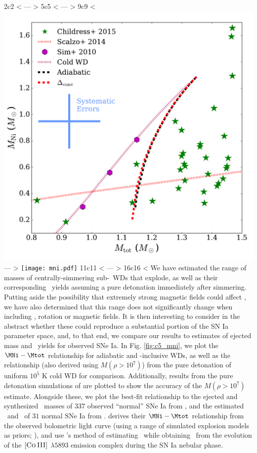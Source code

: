 2c2
< \label{sec:c5_discussion}
---
> \label{sec:discussion}
5c5
< \label{ssec:c5_comparetoobs}
---
> \label{ssec:comparetoobs}
9c9
< \includegraphics[angle=0,width=0.8\columnwidth]{chapter5_zhu+16/figures/mni.pdf}
---
> \texttt{[image: mni.pdf]}
11c11
< \label{fig:c5_mni}
---
> \label{fig:mni}
16c16
< We have estimated the range of masses of centrally-simmering sub-\Mch\ WDs that explode, as well as their corresponding \MNi\ yields assuming a pure detonation immediately after simmering.  Putting aside the possibility that extremely strong magnetic fields could affect \vconv, we have also determined that this range does not significantly change when including \dnabconv, rotation or magnetic fields.  It is then interesting to consider in the abstract whether these could reproduce a substantial portion of the SN Ia parameter space, and, to that end, we compare our results to estimates of ejected mass and \Ni\ yields for observed SNe Ia.  In Fig. \ref{fig:c5_mni}, we plot the $\MNi-\Mtot$ relationship for adiabatic and \dnabconv-inclusive WDs, as well as the relationship (also derived using $M(\rho>10^7)$) from the pure detonation of uniform $10^5$ K cold WD for comparison.  Additionally, results from the pure detonation simulations of \cite{sim+10} are plotted to show the accuracy of the $M(\rho>10^7)$ estimate.  Alongside these, we plot the best-fit relationship to the ejected and synthesized \Ni\ masses of $337$ observed ``normal'' \citep{bran+06} SNe Ia from \cite{scalzrs14}, and the estimated \Mtot\ and \MNi\ of $31$ normal SNe Ia from \cite{chil+15}.  \cite{scalzrs14} derives their $\MNi-\Mtot$ relationship from the observed bolometric light curve (using a range of simulated explosion models as priors; \citealt{scalz+14}), and \cite{chil+15} use \cite{scalzrs14}'s method of estimating \Mtot\ while obtaining \MNi\ from the evolution of the $[\textsc{Co\,III}]$ $\lambda5893$ emission complex during the SN Ia nebular phase.
